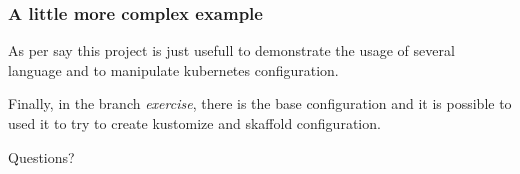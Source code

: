 	\begin{frame}
		\frametitle{A little more complex example}
		
		As per say this project is just usefull to demonstrate the usage of several language and to manipulate kubernetes configuration.
		
		\medskip
		
		Finally, in the branch \textit{exercise}, there is the base configuration and it is possible to used it to try to create kustomize and skaffold configuration.
	\end{frame}
	
	\begin{frame}
		\begin{center}
			Questions?
		\end{center}
	\end{frame}